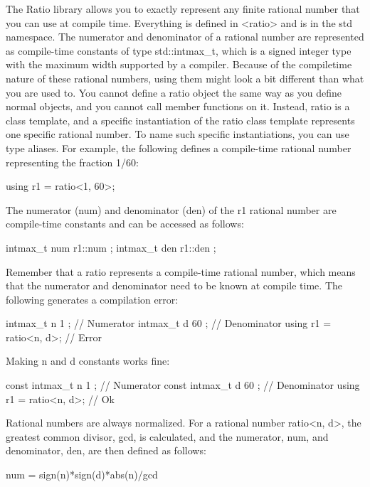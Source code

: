 The Ratio library allows you to exactly represent any finite rational number that you can use at compile time. Everything is defined in <ratio> and is in the std namespace. The numerator and denominator of a rational number are represented as compile-time constants of type std::intmax\_t, which is a signed integer type with the maximum width supported by a compiler. Because of the compiletime nature of these rational numbers, using them might look a bit different than what you are used to. You cannot define a ratio object the same way as you define normal objects, and you cannot call member functions on it. Instead, ratio is a class template, and a specific instantiation of the ratio class template represents one specific rational number. To name such specific instantiations, you can use type aliases. For example, the following defines a compile-time rational number representing the fraction 1/60:

\begin{cpp}
using r1 = ratio<1, 60>;
\end{cpp}

The numerator (num) and denominator (den) of the r1 rational number are compile-time constants and can be accessed as follows:

\begin{cpp}
intmax_t num { r1::num };
intmax_t den { r1::den };
\end{cpp}

Remember that a ratio represents a compile-time rational number, which means that the numerator and denominator need to be known at compile time. The following generates a compilation error:

\begin{cpp}
intmax_t n { 1 }; // Numerator
intmax_t d { 60 }; // Denominator
using r1 = ratio<n, d>; // Error
\end{cpp}

Making n and d constants works fine:

\begin{cpp}
const intmax_t n { 1 }; // Numerator
const intmax_t d { 60 }; // Denominator
using r1 = ratio<n, d>; // Ok
\end{cpp}

Rational numbers are always normalized. For a rational number ratio<n, d>, the greatest common divisor, gcd, is calculated, and the numerator, num, and denominator, den, are then defined as follows:

\begin{cpp}
num = sign(n)*sign(d)*abs(n)/gcd
\end{cpp}

